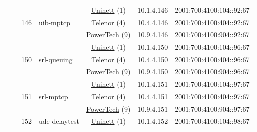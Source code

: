 \begin{small}
\begin{center}
\begin{longtable}{|c|c|c|c|c|c|c|c|}
  &  & \multirow{3}{*}{\tiny{146}} & \multicolumn{1}{|l|}{\multirow{3}{*}{\tiny{uib-mptcp}}} & \multicolumn{2}{|c|}{\tiny{\href{https://www.uninett.no}{Uninett} (1)}} & \tiny{10.1.4.146} & \tiny{2001:700:4100:104::92:67} \\* \cline{5-5}\cline{6-6}\cline{7-7}\cline{8-8}
  &  &  &  & \multicolumn{2}{|c|}{\tiny{\href{https://www.telenor.no}{Telenor} (4)}} & \tiny{10.4.4.146} & \tiny{2001:700:4100:404::92:67} \\* \cline{5-5}\cline{6-6}\cline{7-7}\cline{8-8}
  &  &  &  & \multicolumn{2}{|c|}{\tiny{\href{http://www.powertech.no}{PowerTech} (9)}} & \tiny{10.9.4.146} & \tiny{2001:700:4100:904::92:67} \\* \cline{3-3}\cline{4-4}\cline{5-5}\cline{6-6}\cline{7-7}\cline{8-8}
  &  & \multirow{3}{*}{\tiny{150}} & \multicolumn{1}{|l|}{\multirow{3}{*}{\tiny{srl-queuing}}} & \multicolumn{2}{|c|}{\tiny{\href{https://www.uninett.no}{Uninett} (1)}} & \tiny{10.1.4.150} & \tiny{2001:700:4100:104::96:67} \\* \cline{5-5}\cline{6-6}\cline{7-7}\cline{8-8}
  &  &  &  & \multicolumn{2}{|c|}{\tiny{\href{https://www.telenor.no}{Telenor} (4)}} & \tiny{10.4.4.150} & \tiny{2001:700:4100:404::96:67} \\* \cline{5-5}\cline{6-6}\cline{7-7}\cline{8-8}
  &  &  &  & \multicolumn{2}{|c|}{\tiny{\href{http://www.powertech.no}{PowerTech} (9)}} & \tiny{10.9.4.150} & \tiny{2001:700:4100:904::96:67} \\* \cline{3-3}\cline{4-4}\cline{5-5}\cline{6-6}\cline{7-7}\cline{8-8}
  &  & \multirow{3}{*}{\tiny{151}} & \multicolumn{1}{|l|}{\multirow{3}{*}{\tiny{srl-mptcp}}} & \multicolumn{2}{|c|}{\tiny{\href{https://www.uninett.no}{Uninett} (1)}} & \tiny{10.1.4.151} & \tiny{2001:700:4100:104::97:67} \\* \cline{5-5}\cline{6-6}\cline{7-7}\cline{8-8}
  &  &  &  & \multicolumn{2}{|c|}{\tiny{\href{https://www.telenor.no}{Telenor} (4)}} & \tiny{10.4.4.151} & \tiny{2001:700:4100:404::97:67} \\* \cline{5-5}\cline{6-6}\cline{7-7}\cline{8-8}
  &  &  &  & \multicolumn{2}{|c|}{\tiny{\href{http://www.powertech.no}{PowerTech} (9)}} & \tiny{10.9.4.151} & \tiny{2001:700:4100:904::97:67} \\* \cline{3-3}\cline{4-4}\cline{5-5}\cline{6-6}\cline{7-7}\cline{8-8}
  &  & \multirow{3}{*}{\tiny{152}} & \multicolumn{1}{|l|}{\multirow{3}{*}{\tiny{ude-delaytest}}} & \multicolumn{2}{|c|}{\tiny{\href{https://www.uninett.no}{Uninett} (1)}} & \tiny{10.1.4.152} & \tiny{2001:700:4100:104::98:67} \\* \cline{5-5}\cline{6-6}\cline{7-7}\cline{8-8}

\end{longtable}
\end{center}
\end{small}
